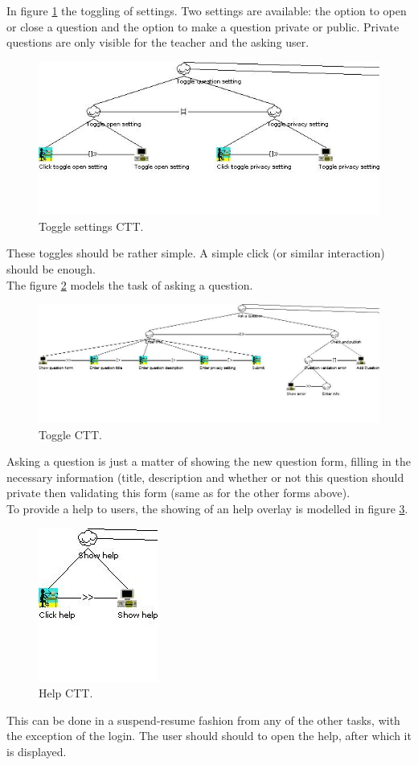 In figure \ref{fig:ctt4} the toggling of settings. Two settings are available: the option to open or close a question and the option to make a question private or public. Private questions are only visible for the teacher and the asking user.
\begin{figure}[H]
\centering
\includegraphics[scale=0.53]{../../ctt/ctt4.jpg}
\caption{Toggle settings CTT.}
\label{fig:ctt4}
\end{figure}
These toggles should be rather simple. A simple click (or similar interaction) should be enough.\\

The figure \ref{fig:ctt5} models the task of asking a question.
\begin{figure}[H]
\centering
\includegraphics[scale=0.43]{../../ctt/ctt5.jpg}
\caption{Toggle CTT.}
\label{fig:ctt5}
\end{figure}
Asking a question is just a matter of showing the new question form, filling in the necessary information (title, description and whether or not this question should private then validating this form (same as for the other forms above).\\

To provide a help to users, the showing of an help overlay is modelled in figure \ref{fig:ctt6}.
\begin{figure}[H]
\centering
\includegraphics[scale=0.53]{../../ctt/ctt6.jpg}
\caption{Help CTT.}
\label{fig:ctt6}
\end{figure}
This can be done in a suspend-resume fashion from any of the other tasks, with the exception of the login. The user should should to open the help, after which it is displayed.

